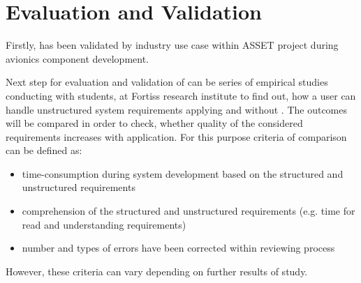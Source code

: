 \section{Evaluation and Validation}
\label{eval}
Firstly, \cbc has been validated by industry use case within ASSET project during avionics component development. 

Next step for evaluation and validation of \cbc can be series of empirical studies conducting with students, at Fortiss research institute to find out, how a user can handle unstructured system requirements applying \cbc and without \cc. The outcomes will be compared in order to check, whether quality of the considered requirements increases with \cc application. For this purpose criteria of comparison can be defined as:
\begin{itemize}
	\item time-consumption during system development based on the structured and unstructured requirements
	\item comprehension of the structured and unstructured requirements (e.g. time for read and understanding requirements)
	\item number and types of errors have been corrected within reviewing process
\end{itemize}

However, these criteria can vary depending on further results of study.
